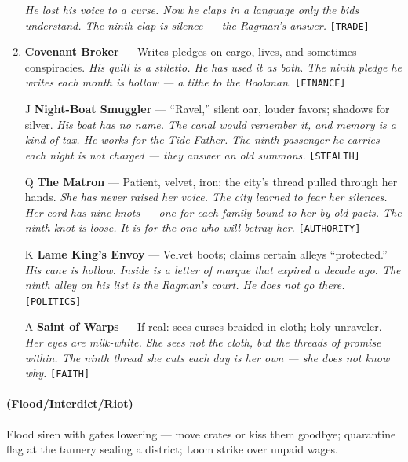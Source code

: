 \begin{enumerate}
  \hfill \textit{He lost his voice to a curse. Now he claps in a language only the bids understand. The ninth clap is silence --- the Ragman's answer.} \texttt{[TRADE]}
\item \textbf{Covenant Broker} --- Writes pledges on cargo, lives, and sometimes conspiracies.
  \hfill \textit{His quill is a stiletto. He has used it as both. The ninth pledge he writes each month is hollow --- a tithe to the Bookman.} \texttt{[FINANCE]}
\item[J] \textbf{Night-Boat Smuggler} --- ``Ravel,'' silent oar, louder favors; shadows for silver.
  \hfill \textit{His boat has no name. The canal would remember it, and memory is a kind of tax. He works for the Tide Father. The ninth passenger he carries each night is not charged --- they answer an old summons.} \texttt{[STEALTH]}
\item[Q] \textbf{The Matron} --- Patient, velvet, iron; the city's thread pulled through her hands.
  \hfill \textit{She has never raised her voice. The city learned to fear her silences. Her cord has nine knots --- one for each family bound to her by old pacts. The ninth knot is loose. It is for the one who will betray her.} \texttt{[AUTHORITY]}
\item[K] \textbf{Lame King's Envoy} --- Velvet boots; claims certain alleys ``protected.''
  \hfill \textit{His cane is hollow. Inside is a letter of marque that expired a decade ago. The ninth alley on his list is the Ragman's court. He does not go there.} \texttt{[POLITICS]}
\item[A] \textbf{Saint of Warps} --- If real: sees curses braided in cloth; holy unraveler.
  \hfill \textit{Her eyes are milk-white. She sees not the cloth, but the threads of promise within. The ninth thread she cuts each day is her own --- she does not know why.} \texttt{[FAITH]}
\end{enumerate}

\paragraph*{(Flood/Interdict/Riot)} Flood siren with gates lowering --- move crates or kiss them goodbye; quarantine flag at the tannery sealing a district; Loom strike over unpaid wages.

